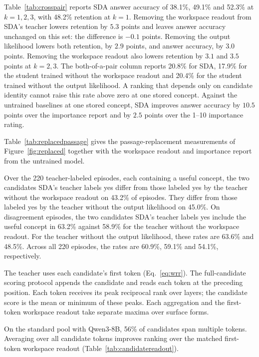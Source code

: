 

Table~\ref{tab:crosspair} reports SDA answer accuracy of 38.1\%, 49.1\%
and 52.3\% at $k=1,2,3$, with 48.2\% retention at $k=1$.
Removing the workspace readout from SDA's teacher lowers retention by
$5.3$ points and leaves answer accuracy unchanged on this set: the
difference is $-0.1$ points. Removing the output likelihood lowers both
retention, by $2.9$ points, and answer accuracy, by $3.0$ points.
Removing the workspace readout also lowers retention by $3.1$ and $3.5$
points at $k=2,3$. The both-of-a-pair column reports 20.8\% for SDA,
17.9\% for the student trained without the workspace readout and
20.4\% for the student trained without the output likelihood.
A ranking that depends only on candidate identity cannot raise this
rate above zero at one stored concept.
Against the untrained baselines at one stored concept, SDA improves
answer accuracy by $10.5$ points over the importance report and by
$2.5$ points over the 1--10 importance rating.



Table~\ref{tab:replacedpassage} gives the passage-replacement
measurements of Figure~\ref{fig:replaced} together with the workspace
readout and importance report from the untrained model.



Over the 220 teacher-labeled episodes, each containing a useful concept,
the two candidates SDA's teacher labels yes differ from those labeled
yes by the teacher without the workspace readout on 43.2\% of episodes.
They differ from those labeled yes by the teacher without the output
likelihood on 45.0\%.
On disagreement episodes, the two candidates SDA's teacher labels yes
include the useful concept in 63.2\% against 58.9\% for the teacher
without the workspace readout. For the teacher without the output
likelihood, these rates are 63.6\% and 48.5\%. Across all 220 episodes,
the rates are 60.9\%, 59.1\% and 54.1\%, respectively.

The teacher uses each candidate's first token (Eq.~\eqref{eq:wrr}).
The full-candidate scoring protocol appends the candidate and reads
each token at the preceding position. Each token receives its peak
reciprocal rank over layers; the candidate score is the mean or minimum
of these peaks. Each aggregation and the first-token workspace readout
take separate maxima over surface forms.

On the standard pool with Qwen3-8B, 56\% of candidates span multiple
tokens. Averaging over all candidate tokens improves ranking over the
matched first-token workspace readout
(Table~\ref{tab:candidatereadout}).


